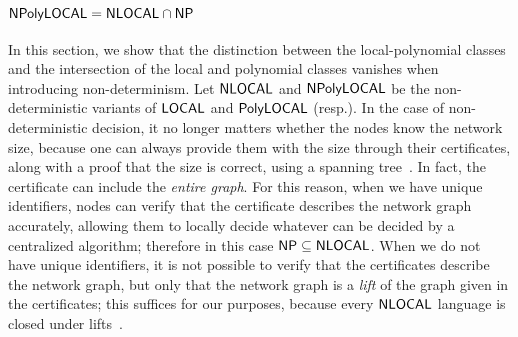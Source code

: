 


\subsection{$\mathsf{NPolyLOCAL} = {\mathsf{NLOCAL}} \cap {\mathsf{NP}}$}
In this section, we show that the distinction between the local-polynomial classes and the intersection of the local and polynomial classes vanishes when introducing non-determinism. Let ${\mathsf{NLOCAL}}$ and $\mathsf{NPolyLOCAL}$ be the non-deterministic variants of ${\mathsf{LOCAL}}$ and ${\mathsf{PolyLOCAL}}$ (resp.). In the case of non-deterministic decision, it no longer matters whether the nodes know the network size, because one can always provide them with the size through their certificates, along with a proof that the size is correct, using a spanning tree~\cite{korman2005proof}.
In fact, the certificate can include the \emph{entire graph}.
For this reason, when we have unique identifiers, nodes can verify that the certificate
describes the network graph accurately, allowing them to locally decide whatever can be decided by a centralized algorithm;
therefore in this case
${\mathsf{NP}} \subseteq {\mathsf{NLOCAL}}$.
When we do not have unique identifiers, it is not possible to verify that the certificates describe the network graph,
but only that the network graph is a \emph{lift} of the graph given in the certificates;
this suffices for our purposes, because every ${\mathsf{NLOCAL}}$ language is closed under lifts~\cite{fraigniaud2013can}.

